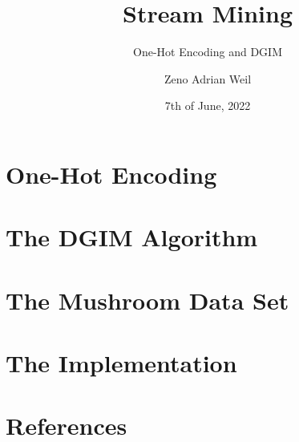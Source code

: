 \documentclass[
	9pt,
	a4paper,
	handout
]{beamer}
\title{Stream Mining}
\subtitle{One-Hot Encoding and DGIM}
\author{Zeno Adrian Weil}
\institute{Data Science 1 \\ Goethe University Frankfurt}
\date{7th of June, 2022}
\begin{document}
	\begin{frame}[plain]
		\titlepage
	\end{frame}

	\section{One-Hot Encoding}
	

	\section{The DGIM Algorithm}
	
	
	\section{The Mushroom Data Set}
	
	\section{The Implementation}

	\section{References}
	
\end{document}
